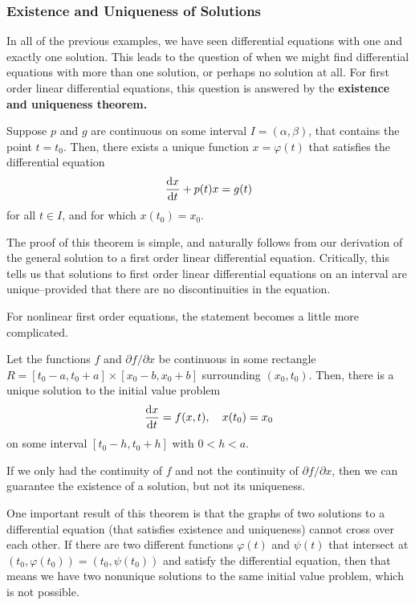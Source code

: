 \subsubsection{Existence and Uniqueness of Solutions}
In all of the previous examples, we have seen differential equations with one and exactly one solution. This leads to the question of when we might find differential equations with more than one solution, or perhaps no solution at all. For first order linear differential equations, this question is answered by the \bf{existence and uniqueness} theorem.
\begin{theorem}
    Suppose $p$ and $g$ are continuous on some interval $I = (\alpha, \beta)$, that contains the point $t=t_0$. Then, there exists a unique function $x=\varphi(t)$ that satisfies the differential equation
    \[ \dv{x}{t} + p(t)x = g(t) \]
    for all $t\in I$, and for which $x(t_0) = x_0$.
\end{theorem}
The proof of this theorem is simple, and naturally follows from our derivation of the general solution to a first order linear differential equation. Critically, this tells us that solutions to first order linear differential equations on an interval are unique--provided that there are no discontinuities in the equation. \par
For nonlinear first order equations, the statement becomes a little more complicated.
\begin{theorem} 
    \label{exuniq}
    Let the functions $f$ and $\partial f / \partial x$ be continuous in some rectangle $R = [t_0 - a, t_0 + a] \times [x_0 - b, x_0 + b]$ surrounding $(x_0, t_0)$. Then, there is a unique solution to the initial value problem 
    \[ \dv{x}{t} = f(x,t), \quad x(t_0) = x_0 \] 
    on some interval $[t_0 - h, t_0 + h]$ with $0 < h < a$.
\end{theorem}
If we only had the continuity of $f$ and not the continuity of $\partial f/\partial x$, then we can guarantee the existence of a solution, but not its uniqueness. \par 
One important result of this theorem is that the graphs of two solutions to a differential equation (that satisfies existence and uniqueness) cannot cross over each other. If there are two different functions $\varphi(t)$ and $\psi(t)$ that intersect at $(t_0, \varphi(t_0)) = (t_0, \psi(t_0))$ and satisfy the differential equation, then that means we have two nonunique solutions to the same initial value problem, which is not possible.
